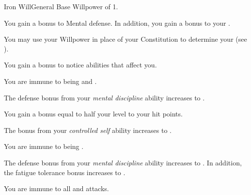     \begin{feat}{Iron Will}{General}
        \featpre Base Willpower of 1.

         You gain a  bonus to Mental defense.
        In addition, you gain a  bonus to your .

         You may use your Willpower in place of your Constitution to determine your  (see ).

         You gain a  bonus to notice  abilities that affect you.

         You are immune to being \dazed and \stunned.

         The defense bonus from your \textit{mental discipline} ability increases to .

         You gain a bonus equal to half your level to your hit points.

         The bonus from your \textit{controlled self} ability increases to .

         You are immune to being \confused.

         The defense bonus from your \textit{mental discipline} ability increases to .
        In addition, the fatigue tolerance bonus increases to .

         You are immune to all  and  attacks.
    \end{feat}

